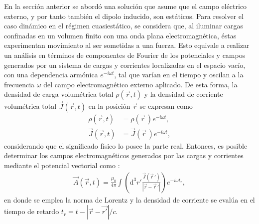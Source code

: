 En la sección anterior se abordó una solución que asume que el campo eléctrico externo, y por tanto también el dipolo inducido, son estáticos. Para resolver el caso dinámico en el régimen cuasiestático, se considera que, al iluminar cargas confinadas en un volumen finito con una onda plana electromagnética, éstas experimentan movimiento al ser sometidas a una fuerza. Esto equivale a realizar un análisis en términos de componentes de Fourier de los potenciales y campos generados por un sistema de cargas y corrientes localizadas en el espacio vacío, con una dependencia armónica $e^{-i\omega t}$, tal que varían en el tiempo y oscilan a la frecuencia $\omega$ del campo electromagnético externo aplicado. De esta forma, la densidad de carga volumétrica total $\rho(\Vec{r},t)$ y la densidad de corriente volumétrica total $\Vec{J}(\Vec{r},t)$  en la posición $\Vec{r}$ se expresan como \cite{Jackson}
\begin{align}
    \rho(\Vec{r},t)&=\rho(\Vec{r}\,)e^{-i\omega t},\nonumber\\
    \Vec{J}(\Vec{r},t)&=\Vec{J}(\Vec{r}\,)e^{-i\omega t},
    \label{armonicf}
\end{align}
considerando que el significado físico lo posee la parte real. Entonces, es posible determinar los campos electromagnéticos generados por las cargas y corrientes mediante el potencial vectorial como \cite{Jackson}:
\begin{align}
  \Vec{A}(\Vec{r},t)=\frac{\mu_0}{4\pi}\int \left( \text{d}^3r'\frac{\Vec{J}(\Vec{r}\,')}{|\Vec{r}-\Vec{r}\,'|}\right)e^{-i\omega t_r},
  \label{Achafa}
\end{align}
en donde se emplea la norma de Lorentz \cite{Griffiths} y la densidad de corriente se evalúa en el tiempo de retardo $t_r=t-|\Vec{r}-\Vec{r'}|/c$. \\

